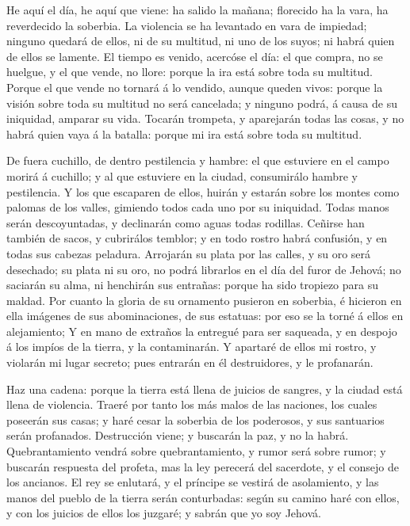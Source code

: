  He aquí el día, he aquí que viene: ha salido la mañana;
florecido ha la vara, ha reverdecido la soberbia.  La
violencia se ha levantado en vara de impiedad; ninguno quedará de ellos,
ni de su multitud, ni uno de los suyos; ni habrá quien de ellos se
lamente.  El tiempo es venido, acercóse el día: el que
compra, no se huelgue, y el que vende, no llore: porque la ira está
sobre toda su multitud.  Porque el que vende no tornará á
lo vendido, aunque queden vivos: porque la visión sobre toda su multitud
no será cancelada; y ninguno podrá, á causa de su iniquidad, amparar su
vida.  Tocarán trompeta, y aparejarán todas las cosas, y no
habrá quien vaya á la batalla: porque mi ira está sobre toda su
multitud.

 De fuera cuchillo, de dentro pestilencia y hambre: el que
estuviere en el campo morirá á cuchillo; y al que estuviere en la
ciudad, consumirálo hambre y pestilencia.  Y los que
escaparen de ellos, huirán y estarán sobre los montes como palomas de
los valles, gimiendo todos cada uno por su iniquidad. 
Todas manos serán descoyuntadas, y declinarán como aguas todas rodillas.
 Ceñirse han también de sacos, y cubrirálos temblor; y en
todo rostro habrá confusión, y en todas sus cabezas peladura.
 Arrojarán su plata por las calles, y su oro será
desechado; su plata ni su oro, no podrá librarlos en el día del furor de
Jehová; no saciarán su alma, ni henchirán sus entrañas: porque ha sido
tropiezo para su maldad.  Por cuanto la gloria de su
ornamento pusieron en soberbia, é hicieron en ella imágenes de sus
abominaciones, de sus estatuas: por eso se la torné á ellos en
alejamiento;  Y en mano de extraños la entregué para ser
saqueada, y en despojo á los impíos de la tierra, y la contaminarán.
 Y apartaré de ellos mi rostro, y violarán mi lugar
secreto; pues entrarán en él destruidores, y le profanarán.

 Haz una cadena: porque la tierra está llena de juicios de
sangres, y la ciudad está llena de violencia.  Traeré por
tanto los más malos de las naciones, los cuales poseerán sus casas; y
haré cesar la soberbia de los poderosos, y sus santuarios serán
profanados.  Destrucción viene; y buscarán la paz, y no la
habrá.  Quebrantamiento vendrá sobre quebrantamiento, y
rumor será sobre rumor; y buscarán respuesta del profeta, mas la ley
perecerá del sacerdote, y el consejo de los ancianos.  El
rey se enlutará, y el príncipe se vestirá de asolamiento, y las manos
del pueblo de la tierra serán conturbadas: según su camino haré con
ellos, y con los juicios de ellos los juzgaré; y sabrán que yo soy
Jehová.

